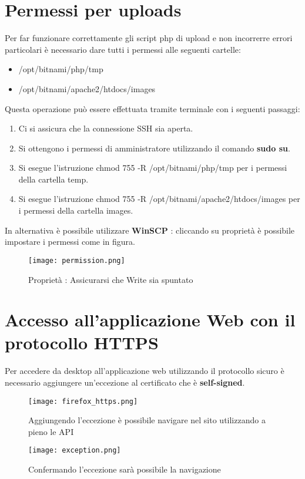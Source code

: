 \section{Permessi per uploads}
Per far funzionare correttamente gli script php di upload e non incorrerre errori particolari è necessario dare tutti i permessi alle seguenti cartelle:
\begin{itemize}
\item /opt/bitnami/php/tmp
\item /opt/bitnami/apache2/htdocs/images
\end{itemize}
Questa operazione può essere effettuata tramite terminale con i seguenti passaggi:
\begin{enumerate}
\item Ci si assicura che la connessione SSH sia aperta.
\item Si ottengono i permessi di amministratore utilizzando il comando \textbf{sudo su}.
\item Si esegue l'istruzione chmod 755 -R /opt/bitnami/php/tmp per i permessi della cartella temp.
\item Si esegue l'istruzione chmod 755 -R /opt/bitnami/apache2/htdocs/images per i permessi della cartella images.
\end{enumerate}
In alternativa è possibile utilizzare \textbf{WinSCP} : cliccando su proprietà è possibile impostare i permessi come in figura.
\begin{figure}[H]
	\centering
	\texttt{[image: permission.png]}
	\caption{Proprietà : Assicurarsi che Write sia spuntato}
\end{figure}

\section{Accesso all'applicazione Web con il protocollo HTTPS}
Per accedere da desktop all'applicazione web utilizzando il protocollo sicuro è necessario aggiungere un'eccezione al certificato che è \textbf{self-signed}. \newline
\begin{figure}[H]
	\centering
	\caption{Aggiungendo l'eccezione è possibile navigare nel sito utilizzando a pieno le API}
	\label{fig:firefox_https}
	\texttt{[image: firefox\_https.png]}
\end{figure} 

\begin{figure}[H]
	\centering
	\caption{Confermando l'eccezione sarà possibile la navigazione}
	\label{fig:exception}
	\texttt{[image: exception.png]}
\end{figure} 

